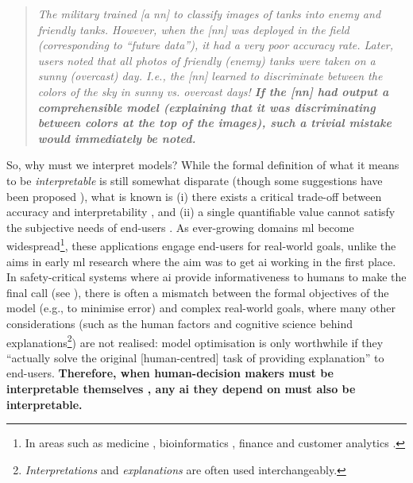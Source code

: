 \begin{quote}
\itshape
The military trained [a \gls{nn}] to classify images of tanks into enemy and friendly tanks. However, when the [\gls{nn}] was deployed in the field (corresponding to ``future data''), it had a very poor accuracy rate. Later, users noted that all photos of friendly (enemy) tanks were taken on a sunny (overcast) day. I.e., the [\gls{nn}] learned to discriminate between the colors of the sky in sunny vs. overcast days! \textbf{If the [\gls{nn}] had output a comprehensible model (explaining that it was discriminating between colors at the top of the images), such a trivial mistake would immediately be noted.}
\upshape
\citet{Freitas:2014ic}
\end{quote}

So, why must we interpret models? While the formal definition of what it means to be \textit{interpretable} is still somewhat disparate (though some suggestions have been proposed \citep{Lipton:2016if}), what is known is (i) there exists a critical trade-off between accuracy and interpretability \citep{Freitas:2004vv,Jin:2006uf,Kaufman:1999vg,Grunwald:2007vg,Domingos:1998ug,Zahalka:2011ux}, and (ii) a single quantifiable value cannot satisfy the subjective needs of end-users \citep{Freitas:2014ic}. As ever-growing domains \gls{ml} become widespread\footnote{In areas such as medicine \citep{Bellazzi:2008tv,Lavrac:1999tf,Pazzani:2001tw,Richards:2001vw,Zupan:2000tp,VanAssche:2007wc,Johansson:2009uo,Elazmeh:2007tp,Wong:2006ve,Jaspers:2011hy,Bussone:2015wm}, bioinformatics \citep{Freitas:2010vk,Szafron:2004uf,Karwath:2002tv,Doderer:2006vt,Jiang:2005ua}, finance \citep{Baehrens:2010tj,Huysmans:2011gq,Dhar:2000vo} and customer analytics \citep{Verbeke:2011vo,Lima:2009tm}.}, these applications engage end-users for real-world goals, unlike the aims in early \gls{ml} research where the aim was to get \gls{ai} working in the first place. In safety-critical systems where \gls{ai} provide informativeness to humans to make the final call (see \citep{Caruana:2015jk,Kim:2015vo,Huysmans:2011gq}), there is often a mismatch between the formal objectives of the model (e.g., to minimise error) and complex real-world goals, where many other considerations (such as the human factors and cognitive science behind explanations\footnote{\textit{Interpretations} and \textit{explanations} are often used interchangeably.}) are not realised: model optimisation is only worthwhile if they ``actually solve the original [human-centred] task of providing explanation'' \citep{Narayanan:2018ud} to end-users. \textbf{Therefore, when human-decision makers must be interpretable themselves \citep{Ridgeway:1998ud}, any \gls{ai} they depend on must also be interpretable.} 

